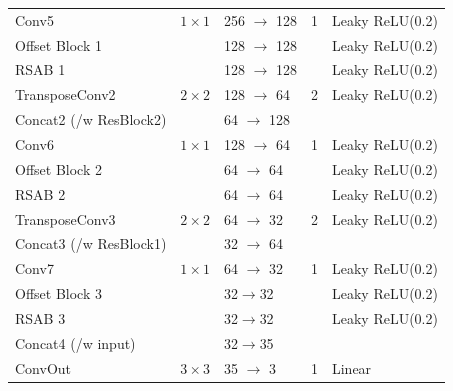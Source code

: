 \begin{table}[t!]
\begin{tabular}{P|P|P|P|P}
Conv5                   & $1\times1$           & 256 $\rightarrow$ 128   & 1               & Leaky ReLU(0.2)        \\
Offset Block 1          &                      & 128 $\rightarrow$ 128   &                 & Leaky ReLU(0.2)        \\
RSAB 1                  &                      & 128 $\rightarrow$ 128   &                 & Leaky ReLU(0.2)        \\ \hline
TransposeConv2          & $2\times2$           & 128 $\rightarrow$ 64    & 2               & Leaky ReLU(0.2)        \\
Concat2 (/w ResBlock2)  &                      & 64 $\rightarrow$ 128    &                 &                        \\
Conv6                   & $1\times1$           & 128 $\rightarrow$ 64    & 1               & Leaky ReLU(0.2)        \\
Offset Block 2          &                      & 64 $\rightarrow$ 64     &                 & Leaky ReLU(0.2)        \\
RSAB 2                  &                      & 64 $\rightarrow$ 64     &                 & Leaky ReLU(0.2)        \\ \hline
TransposeConv3          & $2\times2$           & 64 $\rightarrow$ 32     & 2               & Leaky ReLU(0.2)        \\
Concat3 (/w ResBlock1)  &                      & 32 $\rightarrow$ 64     &                 &                        \\
Conv7                   & $1\times1$           & 64 $\rightarrow$ 32     & 1               & Leaky ReLU(0.2)        \\
Offset Block 3          &                      & 32$\rightarrow$32       &                 & Leaky ReLU(0.2)        \\
RSAB 3                  &                      & 32$\rightarrow$32       &                 & Leaky ReLU(0.2)        \\ \hline
Concat4 (/w input)      &                      & 32$\rightarrow$35       &                 &                        \\
ConvOut                 & $3\times3$           & 35 $\rightarrow$ 3      & 1               & Linear                
\end{tabular}
\end{table}



